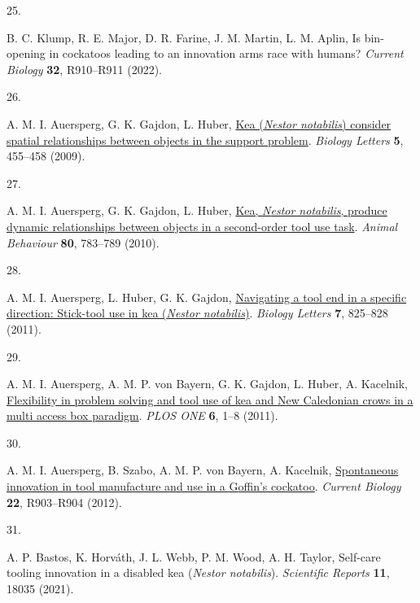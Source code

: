 \documentclass[
  man,floatsintext]{apa6}
\newlength{\cslhangindent}
\newlength{\csllabelwidth}
\newlength{\cslentryspacingunit} %
\newenvironment{CSLReferences}[2] %
 {%
  \setlength{\parindent}{0pt}
  \ifodd #1
  \let\oldpar\par
  \def\par{\hangindent=\cslhangindent\oldpar}
  \fi
  \setlength{\parskip}{#2\cslentryspacingunit}
 }%
 {}
\newcommand{\CSLLeftMargin}[1]{\parbox[t]{\csllabelwidth}{#1}}
\newcommand{\CSLRightInline}[1]{\parbox[t]{\linewidth - \csllabelwidth}{#1}\break}
\begin{document}
\begin{CSLReferences}{0}{0}
\leavevmode{}%
\CSLLeftMargin{25. }%
\CSLRightInline{B. C. Klump, R. E. Major, D. R. Farine, J. M. Martin, L. M. Aplin, Is bin-opening in cockatoos leading to an innovation arms race with humans? \emph{Current Biology} \textbf{32}, R910--R911 (2022).}

\leavevmode{}%
\CSLLeftMargin{26. }%
\CSLRightInline{A. M. I. Auersperg, G. K. Gajdon, L. Huber, \href{https://doi.org/10.1098/rsbl.2009.0114}{Kea (\emph{{N}estor notabilis}) consider spatial relationships between objects in the support problem}. \emph{Biology Letters} \textbf{5}, 455--458 (2009).}

\leavevmode{}%
\CSLLeftMargin{27. }%
\CSLRightInline{A. M. I. Auersperg, G. K. Gajdon, L. Huber, \href{https://doi.org/10.1016/j.anbehav.2010.08.007}{Kea, \emph{{N}estor notabilis}, produce dynamic relationships between objects in a second-order tool use task}. \emph{Animal Behaviour} \textbf{80}, 783--789 (2010).}

\leavevmode{}%
\CSLLeftMargin{28. }%
\CSLRightInline{A. M. I. Auersperg, L. Huber, G. K. Gajdon, \href{https://doi.org/10.1098/rsbl.2011.0388}{Navigating a tool end in a specific direction: Stick-tool use in kea (\emph{{N}estor notabilis})}. \emph{Biology Letters} \textbf{7}, 825--828 (2011).}

\leavevmode{}%
\CSLLeftMargin{29. }%
\CSLRightInline{A. M. I. Auersperg, A. M. P. von Bayern, G. K. Gajdon, L. Huber, A. Kacelnik, \href{https://doi.org/10.1371/journal.pone.0020231}{Flexibility in problem solving and tool use of kea and {N}ew {C}aledonian crows in a multi access box paradigm}. \emph{PLOS ONE} \textbf{6}, 1--8 (2011).}

\leavevmode{}%
\CSLLeftMargin{30. }%
\CSLRightInline{A. M. I. Auersperg, B. Szabo, A. M. P. von Bayern, A. Kacelnik, \href{https://doi.org/10.1016/j.cub.2012.09.002}{Spontaneous innovation in tool manufacture and use in a {G}offin's cockatoo}. \emph{Current Biology} \textbf{22}, R903--R904 (2012).}

\leavevmode{}%
\CSLLeftMargin{31. }%
\CSLRightInline{A. P. Bastos, K. Horváth, J. L. Webb, P. M. Wood, A. H. Taylor, Self-care tooling innovation in a disabled kea (\emph{{N}estor notabilis}). \emph{Scientific Reports} \textbf{11}, 18035 (2021).}


\end{CSLReferences}
\end{document}
